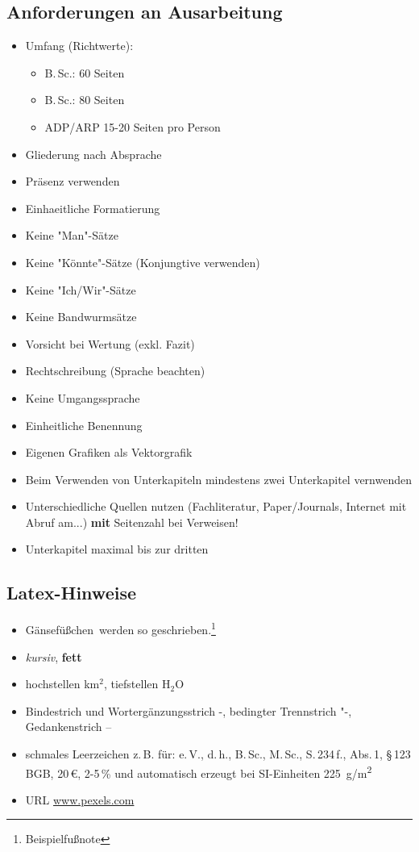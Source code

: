 \subsection{Anforderungen an Ausarbeitung}
\begin{itemize}
    \item Umfang (Richtwerte):
    \begin{itemize}
        \item B.\,Sc.: 60 Seiten
        \item B.\,Sc.: 80 Seiten
        \item ADP/ARP 15-20 Seiten pro Person
    \end{itemize}
    \item Gliederung nach Absprache
    \item Präsenz verwenden
    \item Einhaeitliche Formatierung
    \item Keine "Man"-Sätze
    \item Keine "Könnte"-Sätze (Konjungtive verwenden)
    \item Keine "Ich/Wir"-Sätze
    \item Keine Bandwurmsätze
    \item Vorsicht bei Wertung (exkl. Fazit)
    \item Rechtschreibung (Sprache beachten)
    \item Keine Umgangssprache
    \item Einheitliche Benennung
    \item Eigenen Grafiken als Vektorgrafik
    \item Beim Verwenden von Unterkapiteln mindestens zwei Unterkapitel vernwenden
    \item Unterschiedliche Quellen nutzen (Fachliteratur, Paper/Journals, Internet mit Abruf am...) \textbf{mit} Seitenzahl bei Verweisen!
    \item Unterkapitel maximal bis zur dritten 
\end{itemize}

\subsection{Latex-Hinweise}

\begin{itemize}
    \item \glqq Gänsefüßchen\grqq~werden so geschrieben.\footnote{Beispielfußnote}
    \item \textit{kursiv}, \textbf{fett}
    \item hochstellen km$^2$, tiefstellen H$_{2}$O
    \item Bindestrich und Wortergänzungsstrich -, bedingter Trennstrich "-, Gedankenstrich --
    \item schmales Leerzeichen z.\,B. für: e.\,V., d.\,h., B.\,Sc., M.\,Sc., S.\,234\,f., Abs.\,1, §\,123 BGB, 20\,€, 2-5\,\% und automatisch erzeugt bei SI-Einheiten \SI{225}{g/m^2}
    \item URL \url{www.pexels.com} 
\end{itemize}

